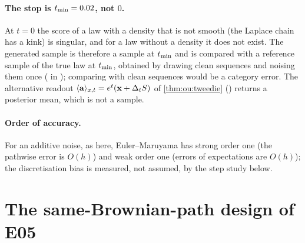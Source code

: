 \paragraph{The stop is $t_{\min}=0.02$, not $0$.} At $t=0$ the score of a law with a
density that is not smooth (the Laplace chain has a kink) is singular, and for a law
without a density it does not exist. The generated sample is therefore a sample at
$t_{\min}$ and is compared with a reference sample of the true law at $t_{\min}$, obtained
by drawing clean sequences and noising them once ( in
); comparing with clean sequences would be a category error. The
alternative readout $\langle \mathbf{a} \rangle_{x,t}=e^{t}(\mathbf{x}+\Delta_tS)$ of \cref{thm:ou:tweedie}
() returns a posterior mean, which is not a sample.

\paragraph{Order of accuracy.} For an additive noise, as here, Euler--Maruyama has
strong order one (the pathwise error is $O(h)$) and weak order one (errors of
expectations are $O(h)$); the discretisation bias is measured, not assumed, by the
step study below.

\section{The same-Brownian-path design of E05}
\label{sec:rev:design}

